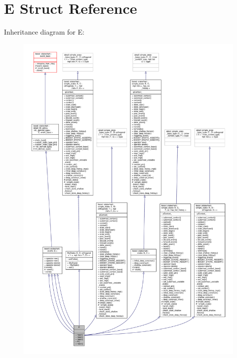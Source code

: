 \hypertarget{struct_e}{}\section{E Struct Reference}
\label{struct_e}


Inheritance diagram for E\+:
\nopagebreak
\begin{figure}[H]
\begin{center}
\leavevmode
\includegraphics[width=350pt]{struct_e__inherit__graph}
\end{center}
\end{figure}



